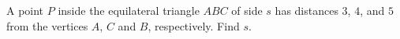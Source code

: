 A point $P$ inside the equilateral triangle $ABC$ of side $s$ has distances $3$, $4$, and $5$ from the vertices $A$, $C$ and $B$, respectively. Find $s$.
